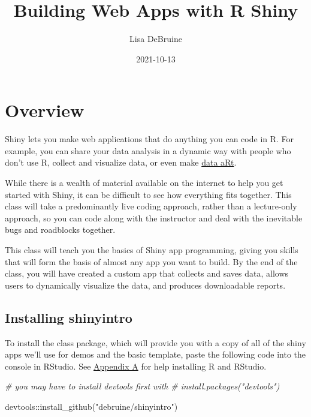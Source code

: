 \documentclass[
  oneside]{book}
\title{Building Web Apps with R Shiny}
\author{Lisa DeBruine}
\date{2021-10-13}
\newenvironment{Shaded}{\begin{snugshade}}{\end{snugshade}}
\newcommand{\CommentTok}[1]{\textcolor[rgb]{0.56,0.35,0.01}{\textit{#1}}}
\newcommand{\FunctionTok}[1]{\textcolor[rgb]{0.00,0.00,0.00}{#1}}
\newcommand{\NormalTok}[1]{#1}
\newcommand{\SpecialCharTok}[1]{\textcolor[rgb]{0.00,0.00,0.00}{#1}}
\newcommand{\StringTok}[1]{\textcolor[rgb]{0.31,0.60,0.02}{#1}}
\begin{document}
\maketitle

{
\setcounter{tocdepth}{1}
\tableofcontents
}
\hypertarget{overview}{%
\chapter*{Overview}\label{overview}}

Shiny lets you make web applications that do anything you can code in R. For example, you can share your data analysis in a dynamic way with people who don't use R, collect and visualize data, or even make \href{https://towardsdatascience.com/getting-started-with-generative-art-in-r-3bc50067d34b}{data aRt}.

While there is a wealth of material available on the internet to help you get started with Shiny, it can be difficult to see how everything fits together. This class will take a predominantly live coding approach, rather than a lecture-only approach, so you can code along with the instructor and deal with the inevitable bugs and roadblocks together.

This class will teach you the basics of Shiny app programming, giving you skills that will form the basis of almost any app you want to build. By the end of the class, you will have created a custom app that collects and saves data, allows users to dynamically visualize the data, and produces downloadable reports.

\hypertarget{installing-shinyintro}{%
\section{Installing shinyintro}\label{installing-shinyintro}}

To install the class package, which will provide you with a copy of all of the shiny apps we'll use for demos and the basic template, paste the following code into the console in RStudio. See \protect\hyperlink{installing-r}{Appendix A} for help installing R and RStudio.

\begin{Shaded}
\begin{Highlighting}[]
\CommentTok{\# you may have to install devtools first with }
\CommentTok{\# install.packages("devtools")}

\NormalTok{devtools}\SpecialCharTok{::}\FunctionTok{install\_github}\NormalTok{(}\StringTok{"debruine/shinyintro"}\NormalTok{)}
\end{Highlighting}
\end{Shaded}
\end{document}
